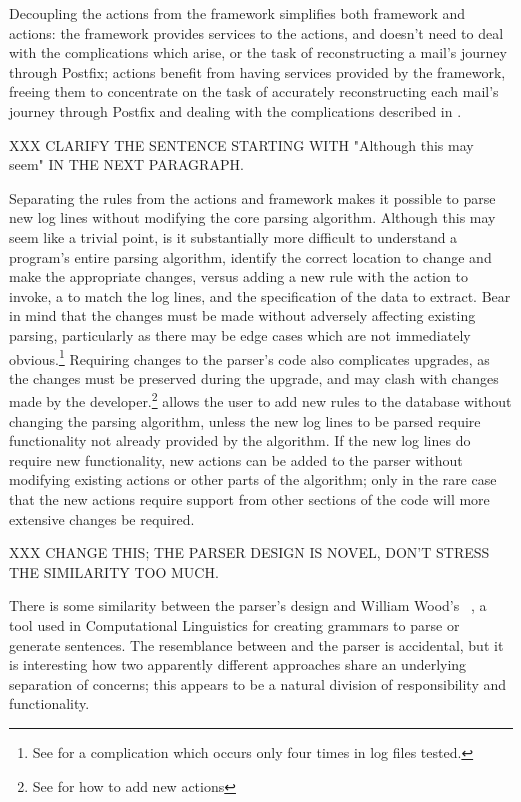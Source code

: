 Decoupling the actions from the framework simplifies both framework and
actions: the framework provides services to the actions, and doesn't need
to deal with the complications which arise, or the task of reconstructing a
mail's journey through Postfix; actions benefit from having services
provided by the framework, freeing them to concentrate on the task of
accurately reconstructing each mail's journey through Postfix and dealing
with the complications described in .

XXX CLARIFY THE SENTENCE STARTING WITH "Although this may seem" IN THE NEXT
PARAGRAPH\@.

Separating the rules from the actions and framework makes it possible to
parse new log lines without modifying the core parsing algorithm.  Although
this may seem like a trivial point, is it substantially more difficult to
understand a program's entire parsing algorithm, identify the correct
location to change and make the appropriate changes, versus adding a new
rule with the action to invoke, a \regex{} to match the log lines, and the
specification of the data to extract.  Bear in mind that the changes must
be made without adversely affecting existing parsing, particularly as there
may be edge cases which are not immediately obvious.\footnote{See
 for a complication which
occurs only four times in \numberOFlogFILES{} log files tested.}  Requiring
changes to the parser's code also complicates upgrades, as the changes
must be preserved during the upgrade, and may clash with changes made by
the developer.\footnote{See  for how to add
new actions}  \parsername{} allows the user to add new rules to the
database without changing the parsing algorithm, unless the new log lines
to be parsed require functionality not already provided by the algorithm.
If the new log lines do require new functionality, new actions can be added
to the parser without modifying existing actions or other parts of the
algorithm; only in the rare case that the new actions require support from
other sections of the code will more extensive changes be required.

XXX CHANGE THIS; THE PARSER DESIGN IS NOVEL, DON'T STRESS THE SIMILARITY
TOO MUCH\@.

There is some similarity between the parser's design and William Wood's
\ATN{}~\cite{atns, nlpip}, a tool used in Computational Linguistics for
creating grammars to parse or generate sentences.  The resemblance between
\ATN{} and the parser is accidental, but it is interesting how two
apparently different approaches share an underlying separation of concerns;
this appears to be a natural division of responsibility and functionality.


